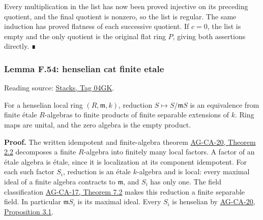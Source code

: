 \documentclass[11pt,a4paper,openany]{report}
\begin{document}
Every multiplication in the list has now been proved injective on its preceding quotient, and the final quotient is nonzero, so the list is regular. The same induction has proved flatness of each successive quotient. If \(c=0\), the list is empty and the only quotient is the original flat ring \(P\), giving both assertions directly. ∎

\label{AG-RG-S05-algebra-lemma-henselian-cat-finite-etale}

\subsubsection{Lemma F.54: henselian cat finite etale}\label{AG-RG-S05-lemma-f.54-henselian-cat-finite-etale}

Reading source: \href{https://stacks.math.columbia.edu/tag/04GK}{Stacks, Tag 04GK}.

For a henselian local ring \((R,\mathfrak m,k)\), reduction \(S\mapsto S/\mathfrak mS\) is an equivalence from finite étale \(R\)-algebras to finite products of finite separable extensions of \(k\). Ring maps are unital, and the zero algebra is the empty product.

\textbf{Proof.} The written idempotent and finite-algebra theorem \href{https://github.com/KokunoYumeto/open-math-courses/blob/main/docs/courses/AG-CA/henselian-local-rings-and-henselization.html}{AG-CA-20, Theorem 2.2} decomposes a finite \(R\)-algebra into finitely many local factors. A factor of an étale algebra is étale, since it is localization at its component idempotent. For each such factor \(S_i\), reduction is an étale \(k\)-algebra and is local: every maximal ideal of a finite algebra contracts to \(\mathfrak m\), and \(S_i\) has only one. The field classification \href{https://github.com/KokunoYumeto/open-math-courses/blob/d02d0a3669f42579db037cd44de1d113fdd770a1/docs/courses/AG-CA/src/formally-smooth-unramified-and-etale-ring-maps.md}{AG-CA-17, Theorem 7.2} makes this reduction a finite separable field. In particular \(\mathfrak mS_i\) is its maximal ideal. Every \(S_i\) is henselian by \href{https://github.com/KokunoYumeto/open-math-courses/blob/main/docs/courses/AG-CA/henselian-local-rings-and-henselization.html}{AG-CA-20, Proposition 3.1}.
\end{document}
